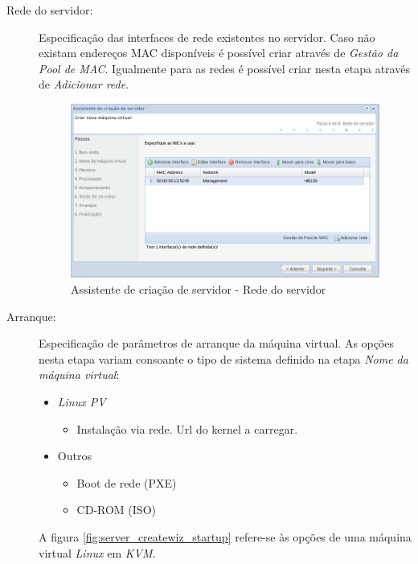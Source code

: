 \begin{description}
        
        \item[Rede do servidor:] Especificação das interfaces de rede existentes no servidor. Caso não existam endereços MAC disponíveis é possível criar através de \emph{Gestão da Pool de MAC}. Igualmente para as redes é possível criar nesta etapa através de \emph{Adicionar rede}.
		\begin{figure}[H]
        		\begin{center}
	        	\includegraphics[scale=0.5]{screenshots/server_createwiz_hostnet.png}
	        	\caption{Assistente de criação de servidor - Rede do servidor}
		        \label{fig:server_createwiz_hostnet}
        		\end{center}
		\end{figure}

        \item[Arranque:] Especificação de parâmetros de arranque da máquina virtual. As opções nesta etapa variam consoante o tipo de sistema definido na etapa \emph{Nome da máquina virtual}:
		\label{sec:add_server_boot}
        \begin{itemize}
			\item \emph{Linux PV}
				\begin{itemize}
					\item Instalação via rede. Url do kernel a carregar.
				\end{itemize}
			\item Outros
				\begin{itemize}
					\item Boot de rede (PXE)
					\item CD-ROM (ISO)
				\end{itemize}
		\end{itemize}
        A figura \ref{fig:server_createwiz_startup} refere-se às opções de uma máquina virtual \emph{Linux} em \emph{KVM}.


\end{description}
